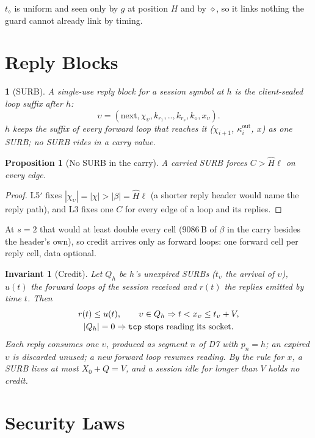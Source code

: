 \documentclass[journal]{IEEEtran}
\newtheorem{invariant}{Invariant}
\newtheorem{proposition}{Proposition}
\newcommand{\namedhead}{}
\newtheorem*{namedenv}{\namedhead}
\newenvironment{defD}[2]{\renewcommand{\namedhead}{Definition #1}%
  \begin{namedenv}[#2]}{\end{namedenv}}
\newcommand{\cl}{\diamond}
\newcommand{\nxt}{\mathrm{next}}
\newcommand{\Hm}{\hat H}
\DeclareRobustCommand{\code}[1]{{\ttfamily\renewcommand{\_}{\textunderscore\allowbreak}#1}}
\begin{document}
$t_\cl$ is uniform and seen only by $g$ at position $H$ and by $\cl$, so it
links nothing the guard cannot already link by timing.

\section{Reply Blocks}\label{sec:surb}

\begin{defD}{D8}{SURB}
A single-use reply block for a session symbol at $h$ is the client-sealed
loop suffix after $h$:
\[
\upsilon=(\nxt,\chi_\upsilon,k_{r_1},..,k_{r_s},k_{\cl},x_\upsilon).
\]
$h$ keeps the suffix of every forward loop that reaches it
($\chi_{i+1}$, $\kappa^{\mathrm{out}}_i$, $x$) as one SURB; no SURB rides in
a carry value.
\end{defD}

\begin{proposition}[No SURB in the carry]\label{prop:nosurb}
A carried SURB forces $C>\Hm\ell$ on every edge.
\end{proposition}
\begin{proof}
L5$'$ fixes $|\chi_\upsilon|=|\chi|>|\beta|=\Hm\ell$ (a shorter reply
header would name the reply path), and L3 fixes one $C$ for every edge of a loop and its
replies.
\end{proof}

At $s=2$ that would at least double every cell ($9086$\,B of $\beta$ in
the carry besides the header's own), so credit arrives only as forward
loops: one forward cell per reply cell, data optional.

\begin{invariant}[Credit]\label{inv:credit}
Let $Q_h$ be $h$'s unexpired SURBs ($t_\upsilon$ the arrival of $\upsilon$), $u(t)$ the forward loops of the
session received and $r(t)$ the replies emitted by time $t$.  Then
\begin{gather*}
r(t)\le u(t),\qquad \upsilon\in Q_h\Rightarrow t<x_\upsilon\le
t_\upsilon+V,\\
|Q_h|=0\Rightarrow\text{\code{tcp} stops reading its socket.}
\end{gather*}
Each reply consumes one $\upsilon$, produced as segment $n$ of D7 with
$p_n=h$; an expired $\upsilon$ is discarded unused; a new forward loop
resumes reading.  By the rule for $x$, a SURB lives at most $X_0+Q=V$,
and a session idle for longer than $V$ holds no credit.
\end{invariant}

\section{Security Laws}\label{sec:laws}
\end{document}
